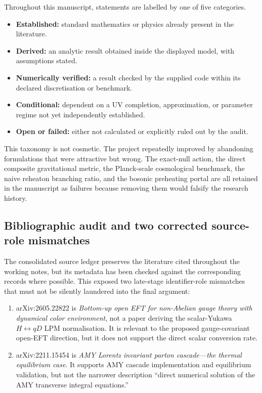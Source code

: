 \documentclass[
]{article}
\providecommand{\tightlist}{%
  \setlength{\itemsep}{0pt}\setlength{\parskip}{0pt}}
\begin{document}
Throughout this manuscript, statements are labelled by one of five
categories.

\begin{itemize}
\tightlist
\item
  \textbf{Established:} standard mathematics or physics already present
  in the literature.
\item
  \textbf{Derived:} an analytic result obtained inside the displayed
  model, with assumptions stated.
\item
  \textbf{Numerically verified:} a result checked by the supplied code
  within its declared discretisation or benchmark.
\item
  \textbf{Conditional:} dependent on a UV completion, approximation, or
  parameter regime not yet independently established.
\item
  \textbf{Open or failed:} either not calculated or explicitly ruled out
  by the audit.
\end{itemize}

This taxonomy is not cosmetic. The project repeatedly improved by
abandoning formulations that were attractive but wrong. The exact-null
action, the direct composite gravitational metric, the Planck-scale
cosmological benchmark, the naive reheaton branching ratio, and the
bosonic preheating portal are all retained in the manuscript as failures
because removing them would falsify the research history.

\subsection{Bibliographic audit and two corrected source-role
mismatches}\label{bibliographic-audit-and-two-corrected-source-role-mismatches}

The consolidated source ledger preserves the literature cited throughout
the working notes, but its metadata has been checked against the
corresponding records where possible. This exposed two late-stage
identifier-role mismatches that must not be silently laundered into the
final argument:

\begin{enumerate}
\def\labelenumi{\arabic{enumi}.}
\tightlist
\item
  arXiv:2605.22822 is \emph{Bottom-up open EFT for non-Abelian gauge
  theory with dynamical color environment}, not a paper deriving the
  scalar-Yukawa \(H\leftrightarrow qD\) LPM normalisation. It is
  relevant to the proposed gauge-covariant open-EFT direction, but it
  does not support the direct scalar conversion rate.
\item
  arXiv:2211.15454 is \emph{AMY Lorentz invariant parton cascade---the
  thermal equilibrium case}. It supports AMY cascade implementation and
  equilibrium validation, but not the narrower description ``direct
  numerical solution of the AMY transverse integral equations.''
\end{enumerate}
\end{document}
